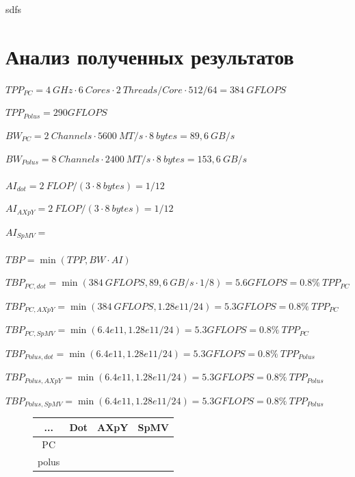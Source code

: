 \documentclass[12pt, a4paper]{article}
\begin{document}
sdfs

\newpage

\section{Анализ полученных результатов}

$ TPP_{PC} = 4\ GHz \cdot 6\ Cores \cdot 2\ Threads/Core \cdot 512/64 = 384\ GFLOPS $ 

$ TPP_{Polus} = 290 GFLOPS $

$ BW_{PC} = 2\ Channels \cdot 5600\ MT/s \cdot 8\ bytes = 89,6\ GB/s $

$ BW_{Polus} = 8\ Channels \cdot 2400\ MT/s \cdot 8\ bytes = 153,6\ GB/s $ \\ \\

$ AI_{dot} = 2\ FLOP / (3 \cdot 8\ bytes) = 1/12 $

$ AI_{AXpY} = 2\ FLOP / (3 \cdot 8\ bytes) = 1/12  $

$ AI_{SpMV} =   $ \\ \\

$ TBP = \min(TPP, BW \cdot AI)  $

$ TBP_{PC, dot} = \min(384\ GFLOPS, 89,6\ GB/s \cdot 1/8) = 5.6 GFLOPS = 0.8\% \ TPP_{PC} $

$ TBP_{PC, AXpY} = \min(384\ GFLOPS, 1.28e11/24) = 5.3 GFLOPS = 0.8\% \ TPP_{PC} $

$ TBP_{PC, SpMV} = \min(6.4e11, 1.28e11/24) = 5.3 GFLOPS = 0.8\% \ TPP_{PC} $

$ TBP_{Polus, dot} = \min(6.4e11, 1.28e11/24) = 5.3 GFLOPS = 0.8\% \ TPP_{Polus} $

$ TBP_{Polus, AXpY} = \min(6.4e11, 1.28e11/24) = 5.3 GFLOPS = 0.8\% \ TPP_{Polus} $

$ TBP_{Polus, SpMV} = \min(6.4e11, 1.28e11/24) = 5.3 GFLOPS = 0.8\% \ TPP_{Polus} $

\begin{figure}[h!]
	\center
	\setlength{\tabcolsep}{10pt}
	\renewcommand{\arraystretch}{1.5}
	\begin{tabular}{|c|c|c|c|}
		\hline
		... & Dot & AXpY & SpMV \\
		\hline
		PC &  &  &  \\
		\hline
		polus &  &  &  \\
		\hline
	\end{tabular}
	\caption{}
	\label{fig:tbps}
\end{figure}
\end{document}
